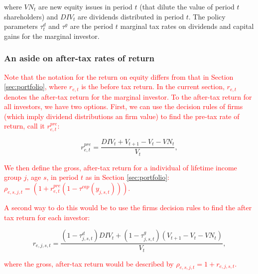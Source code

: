\noindent\noindent where  $VN_{t}$ are new equity issues in period $t$ (that dilute the value of period $t$ shareholders) and $DIV_{t}$ are dividends distributed in period $t$. The policy parameters $\tau^{d}_{t}$ and $\tau^{g}$ are the period $t$ marginal tax rates on dividends and capital gains for the marginal investor.

\subsubsection{An aside on after-tax rates of return}

\textcolor{red}{Note that the notation for the return on equity differs from that in Section \ref{sec:portfolio}, where $r_{e,t}$ is the before tax return.  In the current section, $r_{e,t}$ denotes the after-tax return for the marginal investor.  To the after-tax return for all investors, we have two options.  First, we can use the decision rules of firms (which imply dividend distributions an firm value) to find the pre-tax rate of return, call it $r^{pre}_{e,t}$:}

\begin{equation}
r^{pre}_{e,t}=\frac{DIV_{t}+V_{t+1}-V_{t}-VN_{t}}{V_{t}},
\end{equation}

\noindent\noindent \textcolor{red}{We then define the gross, after-tax return for a individual of lifetime income group $j$, age $s$, in period $t$ as in Section \ref{sec:portfolio}: $\rho_{e,s,j,t}=(1+r^{pre}_{e,t}(1-\tau^{cap}(y_{j,s,t})))$.}

\textcolor{red}{A second way to do this would be to use the firms decision rules to find the after tax return for each investor:}

\begin{equation}
r_{e,j,s,t} = \frac{(1-\tau^{d}_{j,s,t})DIV_{t}+(1-\tau^{g}_{j,s,t})(V_{t+1}-V_{t}-VN_{t})}{V_{t}},
\end{equation} 

\noindent\noindent \textcolor{red}{where the gross, after-tax return would be described by $\rho_{e,s,j,t}=1+r_{e,j,s,t}$.}

